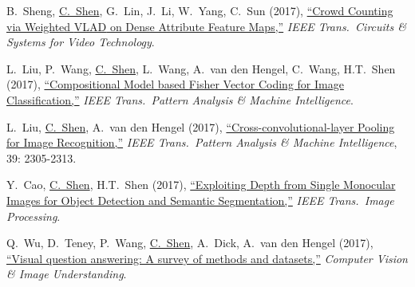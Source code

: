 \documentclass[9pt, a4paper]{article}
\newcommand{\years}[1]{\marginnote{\scriptsize #1}}
\def\highlight{\uline}
\begin{document}
\medskip

\years{2017} B.~Sheng, \highlight{C.~Shen}, G.~Lin, J.~Li, W.~Yang, C.~Sun (2017),
\href{http://www.google.com/search?lr=&ie=UTF-8&oe=UTF-8&q=Crowd+Counting+via+Weighted+VLAD+on+Dense+Attribute+Feature+Maps+Biyun+Sheng%2C+Chunhua+Shen%2C+Guosheng+Lin%2C+Jun+Li%2C+Wankou+Yang%2C+Changyin+Sun}{``Crowd Counting via Weighted {VLAD} on Dense Attribute Feature Maps,{}''}
\emph{IEEE Trans.\  Circuits \& Systems for Video Technology}.

\medskip

\years{2017} L.~Liu, P.~Wang, \highlight{C.~Shen}, L.~Wang, A.~van den Hengel, C.~Wang, H.T.~Shen (2017),
\href{http://www.google.com/search?lr=&ie=UTF-8&oe=UTF-8&q=Compositional+Model+based+Fisher+Vector+Coding+for+Image+Classification+Lingqiao+Liu%2C+Peng+Wang%2C+Chunhua+Shen%2C+Lei+Wang%2C+Anton+van+den+Hengel%2C+Chao+Wang%2C+Heng+Tao+Shen}{``Compositional Model based {F}isher Vector Coding for Image Classification,{}''}
\emph{IEEE Trans.\  Pattern Analysis \& Machine Intelligence}.

\medskip

\years{2017} L.~Liu, \highlight{C.~Shen}, A.~van den Hengel (2017),
\href{http://www.google.com/search?lr=&ie=UTF-8&oe=UTF-8&q=Cross-convolutional-layer+Pooling+for+Image+Recognition+Lingqiao+Liu%2C+Chunhua+Shen%2C+Anton+van+den+Hengel}{``Cross-convolutional-layer Pooling for Image Recognition,{}''}
\emph{IEEE Trans.\  Pattern Analysis \& Machine Intelligence}, 39: 2305-2313.

\medskip

\years{2017} Y.~Cao, \highlight{C.~Shen}, H.T.~Shen (2017),
\href{http://www.google.com/search?lr=&ie=UTF-8&oe=UTF-8&q=Exploiting+Depth+from+Single+Monocular+Images+for+Object+Detection+and+Semantic+Segmentation+Yuanzhouhan+Cao%2C+Chunhua+Shen%2C+Heng+Tao+Shen}{``Exploiting Depth from Single Monocular Images for Object Detection and Semantic Segmentation,{}''}
\emph{IEEE Trans.\  Image Processing}.

\medskip

\years{2017} Q.~Wu, D.~Teney, P.~Wang, \highlight{C.~Shen}, A.~Dick, A.~van den Hengel (2017),
\href{http://www.google.com/search?lr=&ie=UTF-8&oe=UTF-8&q=Visual+question+answering%3A+A+survey+of+methods+and+datasets+Qi+Wu%2C+Damien+Teney%2C+Peng+Wang%2C+Chunhua+Shen%2C+Anthony+Dick%2C+Anton+van+den+Hengel}{``Visual question answering: A survey of methods and datasets,{}''}
\emph{Computer Vision \& Image Understanding}.

\medskip
\end{document}
